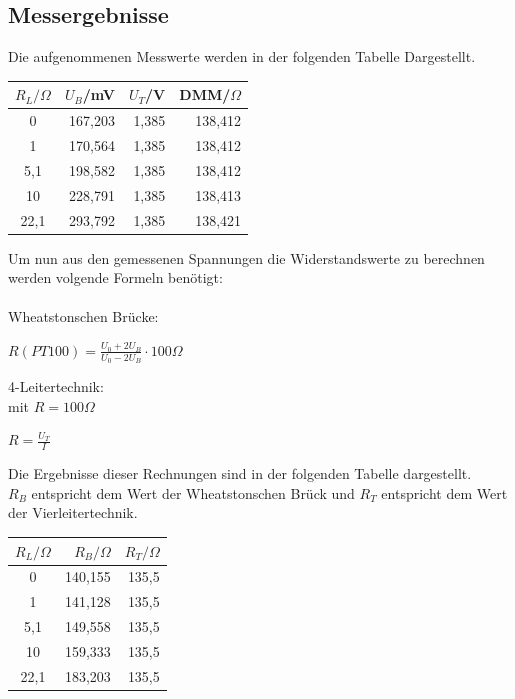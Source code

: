 \documentclass[a4paper,11pt,oneside]{article}
\begin{document}
\subsection{Messergebnisse}
Die aufgenommenen Messwerte werden in der folgenden Tabelle Dargestellt.\\
\begin{center}
\begin{tabular}{|c|r|r|r|}
\hline 
$R_L/\Omega $ & $U_{B}$/mV & $U_{T}$/V & DMM/$\Omega$ \\ 
\hline 
0 & 167,203 & 1,385 & 138,412 \\ 
\hline 
1 & 170,564 & 1,385 & 138,412 \\ 
\hline 
5,1 & 198,582 & 1,385 & 138,412 \\ 
\hline 
10 & 228,791 & 1,385 & 138,413 \\ 
\hline 
22,1 & 293,792 & 1,385 & 138,421 \\ 
\hline 
\end{tabular} 
\end{center}
\vspace{1cm}
Um nun aus den gemessenen Spannungen die Widerstandswerte zu berechnen werden volgende Formeln benötigt:\\\\
Wheatstonschen Brücke:\\
\begin{center}
$R(PT100)= \frac{U_0+2U_B}{U_0-2U_B}\cdot 100\Omega$

\end{center}
4-Leitertechnik:\\
mit $R=100\Omega$\\
\begin{center}
$R=\frac{U_T}{I}$
\end{center}
Die Ergebnisse dieser Rechnungen sind in der folgenden Tabelle dargestellt.\\
$R_B$ entspricht dem Wert der Wheatstonschen Brück und $R_T$ entspricht dem Wert der Vierleitertechnik.
\begin{center}
\begin{tabular}{|c|r|r|}
\hline 
$R_L/\Omega$ & $R_B/\Omega$ & $R_T/\Omega$ \\ 
\hline 
0 & 140,155 & 135,5 \\ 
\hline 
1 & 141,128 & 135,5 \\ 
\hline 
5,1 & 149,558 & 135,5 \\ 
\hline 
10 & 159,333 & 135,5 \\ 
\hline 
22,1 & 183,203 & 135,5 \\ 
\hline 
\end{tabular} 
\end{center}
\end{document}
